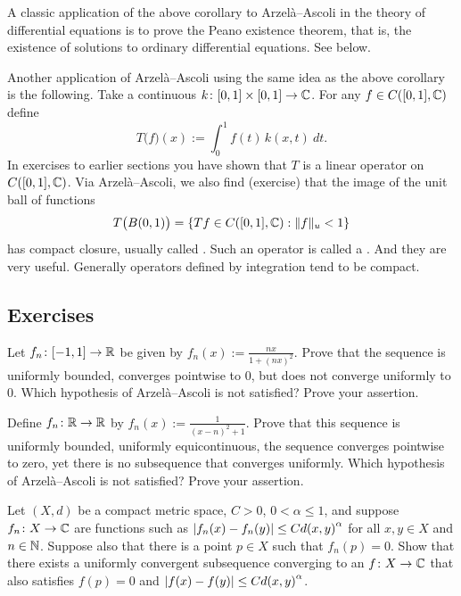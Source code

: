 A classic application of the above corollary to Arzel\`a--Ascoli
in the theory of differential
equations is to prove the Peano existence
theorem, that is, the existence of solutions to ordinary differential
equations.  See  below.

\medskip

Another application of Arzel\`a--Ascoli using the same idea as the
above corollary is the following.
Take a continuous $k \colon [0,1] \times [0,1] \to {\mathbb{C}}$.
For any $f \in C([0,1],{\mathbb{C}})$ define
\begin{equation*}
T\bigl(f\bigr)(x) :=  \int_0^1 f(t) \, k(x,t)~dt .
\end{equation*}
In exercises to earlier sections you have shown that 
$T$ is a linear operator on $C([0,1],{\mathbb{C}})$.
Via Arzel\`a--Ascoli, we also find (exercise) that
the image of the unit ball of functions
\begin{equation*}
T\bigl( B(0,1) \bigr) = 
\left\{
Tf \in C([0,1],{\mathbb{C}}) :  
\lVert {f} \rVert_u < 1
\right\}
\end{equation*}
has compact closure, usually called
\emph{}.
Such an operator is called a \emph{}.
And they are very useful.  Generally operators defined by
integration tend to be compact.

\subsection{Exercises}

\begin{exercise}
Let $f_n \colon [-1,1] \to {\mathbb{R}}$ be given by $f_n(x) := \frac{nx}{1+{(nx)}^2}$.
Prove that the sequence is uniformly bounded, converges pointwise to 0, but
does not converge uniformly to 0.
Which hypothesis of Arzel{\`a}--Ascoli
is not satisfied?  Prove your assertion.
\end{exercise}

\begin{exercise}
Define $f_n \colon {\mathbb{R}} \to {\mathbb{R}}$ by $f_n(x) := \frac{1}{{(x-n)}^2+1}$.  Prove that
this sequence is uniformly bounded, uniformly equicontinuous, the sequence
converges pointwise to zero, yet there is no
subsequence that converges uniformly.
Which hypothesis of Arzel{\`a}--Ascoli
is not satisfied?  Prove your assertion.
\end{exercise}

\begin{exercise}
Let $(X,d)$ be a compact metric space, $C > 0$, $0 < \alpha \leq 1$, and
suppose $f_n \colon X \to {\mathbb{C}}$ are functions such as
$\left\lvert {f_n(x)-f_n(y)} \right\rvert \leq C {d(x,y)}^\alpha$ for all $x,y \in X$ and
$n \in {\mathbb{N}}$.  Suppose also that there is a point $p \in X$ such that
$f_n(p) = 0$.
Show that there exists a uniformly convergent subsequence converging to
an $f \colon X \to {\mathbb{C}}$ that also satisfies $f(p) = 0$ and
$\left\lvert {f(x)-f(y)} \right\rvert \leq C {d(x,y)}^\alpha$.
\end{exercise}

